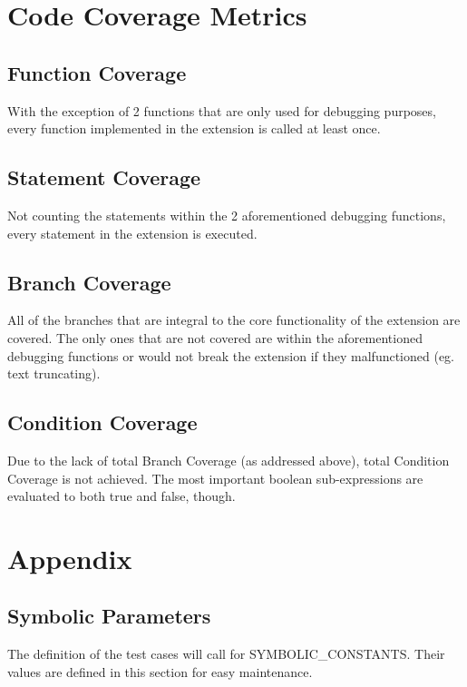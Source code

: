 \documentclass[12pt, titlepage]{article}
\begin{document}
\section{Code Coverage Metrics}

\subsection{Function Coverage}
	With the exception of 2 functions that are only used for debugging 
	purposes, every function implemented in the extension is called at least 
	once.
	
\subsection{Statement Coverage}
	Not counting the statements within the 2 aforementioned debugging 
	functions, every statement in the extension is executed.
	
\subsection{Branch Coverage}
	All of the branches that are integral to the core functionality of the 
	extension are covered. The only ones that are not covered are within the 
	aforementioned debugging functions or would not break the extension if they 
	malfunctioned (eg. text truncating).
	
\subsection{Condition Coverage}
	Due to the lack of total Branch Coverage (as addressed above), total 
	Condition Coverage is not achieved. The most important boolean 
	sub-expressions are evaluated to both true and false, though.

\section{Appendix}

\subsection{Symbolic Parameters}

The definition of the test cases will call for SYMBOLIC\_CONSTANTS.
Their values are defined in this section for easy maintenance.
\end{document}
